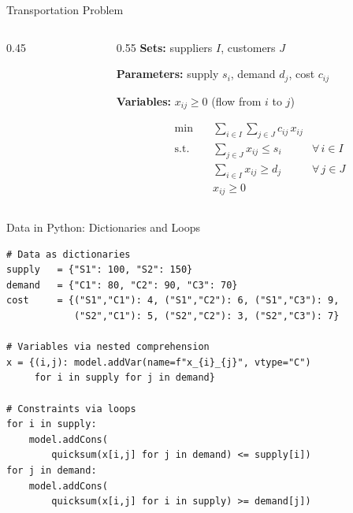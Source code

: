 \documentclass[aspectratio=169,10pt]{beamer}
\begin{document}
\begin{frame}{Transportation Problem}
\begin{columns}[T]
\begin{column}{0.45\textwidth}
\begin{center}
\end{center}
\end{column}
\begin{column}{0.55\textwidth}
\textbf{Sets:} suppliers $I$, customers $J$

\textbf{Parameters:} supply $s_i$, demand $d_j$, cost $c_{ij}$

\textbf{Variables:} $x_{ij} \ge 0$ (flow from $i$ to $j$)

\begin{align*}
  \min \quad & \sum_{i \in I}\sum_{j \in J} c_{ij}\, x_{ij} \\
  \text{s.t.} \quad
    & \sum_{j \in J} x_{ij} \le s_i  & \forall\, i \in I \\
    & \sum_{i \in I} x_{ij} \ge d_j  & \forall\, j \in J \\
    & x_{ij} \ge 0
\end{align*}
\end{column}
\end{columns}
\end{frame}

\begin{frame}[fragile]{Data in Python: Dictionaries and Loops}
\begin{lstlisting}
# Data as dictionaries
supply   = {"S1": 100, "S2": 150}
demand   = {"C1": 80, "C2": 90, "C3": 70}
cost     = {("S1","C1"): 4, ("S1","C2"): 6, ("S1","C3"): 9,
            ("S2","C1"): 5, ("S2","C2"): 3, ("S2","C3"): 7}

# Variables via nested comprehension
x = {(i,j): model.addVar(name=f"x_{i}_{j}", vtype="C")
     for i in supply for j in demand}

# Constraints via loops
for i in supply:
    model.addCons(
        quicksum(x[i,j] for j in demand) <= supply[i])
for j in demand:
    model.addCons(
        quicksum(x[i,j] for i in supply) >= demand[j])
\end{lstlisting}
\end{frame}
\end{document}
